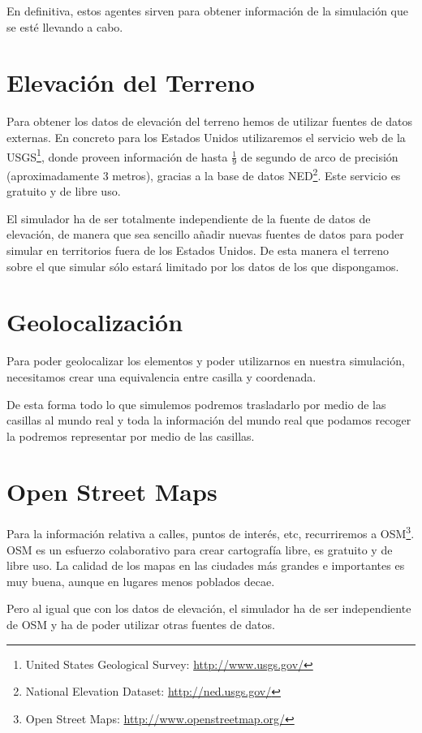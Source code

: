 En definitiva, estos agentes sirven para obtener información de la simulación
que se esté llevando a cabo.

\section*{Elevación del Terreno}

Para obtener los datos de elevación del terreno hemos de utilizar fuentes de
datos externas. En concreto para los Estados Unidos utilizaremos el servicio
web de la USGS\footnote{United States Geological Survey:
\url{http://www.usgs.gov/}}, donde proveen información de hasta $ \tfrac{1}{9} $
de segundo de arco de precisión (aproximadamente 3 metros), gracias a la base de
datos NED\footnote{National Elevation Dataset: \url{http://ned.usgs.gov/}}. Este
servicio es gratuito y de libre uso.

El simulador ha de ser totalmente independiente de la fuente de datos de
elevación, de manera que sea sencillo añadir nuevas fuentes de datos para poder
simular en territorios fuera de los Estados Unidos. De esta manera el terreno
sobre el que simular sólo estará limitado por los datos de los que dispongamos.

\section*{Geolocalización}
Para poder geolocalizar los elementos y
poder utilizarnos en nuestra simulación, necesitamos crear una equivalencia
entre casilla y coordenada.

De esta forma todo lo que simulemos podremos trasladarlo por medio de las
casillas al mundo real y toda la información del mundo real que podamos recoger
la podremos representar por medio de las casillas.

\section*{Open Street Maps}

Para la información relativa a calles, puntos de interés, etc, recurriremos a
OSM\footnote{Open Street Maps: \url{http://www.openstreetmap.org/}}. OSM es un
esfuerzo colaborativo para crear cartografía libre, es gratuito y de libre uso.
La calidad de los mapas en las ciudades más grandes e importantes es muy buena,
aunque en lugares menos poblados decae.

Pero al igual que con los datos de elevación, el simulador ha de ser
independiente de OSM y ha de poder utilizar otras fuentes de datos.

